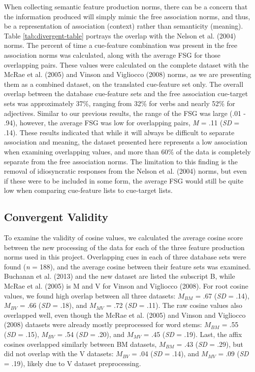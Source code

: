 \documentclass[english,man]{apa6}
\theoremstyle{definition}
\theoremstyle{definition}
\theoremstyle{definition}
\theoremstyle{remark}
\begin{document}
When collecting semantic feature production norms, there can be a
concern that the information produced will simply mimic the free
association norms, and thus, be a representation of association
(context) rather than semanticity (meaning). Table
\ref{tab:divergent-table} portrays the overlap with the Nelson et al.
(2004) norms. The percent of time a cue-feature combination was present
in the free association norms was calculated, along with the average FSG
for those overlapping pairs. These values were calculated on the
complete dataset with the McRae et al. (2005) and Vinson and Vigliocco
(2008) norms, as we are presenting them as a combined dataset, on the
translated cue-feature set only. The overall overlap between the
database cue-feature sets and the free association cue-target sets was
approximately 37\%, ranging from 32\% for verbs and nearly 52\% for
adjectives. Similar to our previous results, the range of the FSG was
large (.01 - .94), however, the average FSG was low for overlapping
pairs, \emph{M} = .11 (\emph{SD} = .14). These results indicated that
while it will always be difficult to separate association and meaning,
the dataset presented here represents a low association when examining
overlapping values, and more than 60\% of the data is completely
separate from the free association norms. The limitation to this finding
is the removal of idiosyncratic responses from the Nelson et al. (2004)
norms, but even if these were to be included in some form, the average
FSG would still be quite low when comparing cue-feature lists to
cue-target lists.

\subsection{Convergent Validity}\label{convergent-validity}

To examine the validity of cosine values, we calculated the average
cosine score between the new processing of the data for each of the
three feature production norms used in this project. Overlapping cues in
each of three database sets were found (\emph{n} = 188), and the average
cosine between their feature sets was examined. Buchanan et al. (2013)
and the new dataset are listed the subscript B, while McRae et al.
(2005) is M and V for Vinson and Vigliocco (2008). For root cosine
values, we found high overlap between all three datasets: \(M_{BM}\) =
.67 (\emph{SD} = .14), \(M_{BV}\) = .66 (\emph{SD} = .18), and
\(M_{MV}\) = .72 (\emph{SD} = .11). The raw cosine values also
overlapped well, even though the McRae et al. (2005) and Vinson and
Vigliocco (2008) datasets were already mostly preprocessed for word
stems: \(M_{BM}\) = .55 (\emph{SD} = .15), \(M_{BV}\) = .54 (\emph{SD} =
.20), and \(M_{MV}\) = .45 (\emph{SD} = .19). Last, the affix cosines
overlapped similarly between BM datasets, \(M_{BM}\) = .43 (\emph{SD} =
.29), but did not overlap with the V datasets: \(M_{BV}\) = .04
(\emph{SD} = .14), and \(M_{MV}\) = .09 (\emph{SD} = .19), likely due to
V dataset preprocessing.
\end{document}
